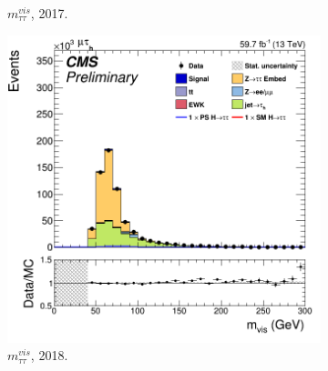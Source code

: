 \begin{figure}
\begin{subfigure}[b]{0.33\linewidth}
    \caption{$m_{\tau\tau}^{vis}$, 2017.} 
    \vspace{0.5ex}
  \end{subfigure} 
    \begin{subfigure}[b]{0.33\linewidth}
    \centering
    \includegraphics[width=\linewidth]{Chapitre7/Images/CtrlPlots/2018/VisibleMass.png} 
    \caption{$m_{\tau\tau}^{vis}$, 2018.} 
    \vspace{0.5ex}
  \end{subfigure} 
  \caption{}
  \label{page2}
\end{figure}

